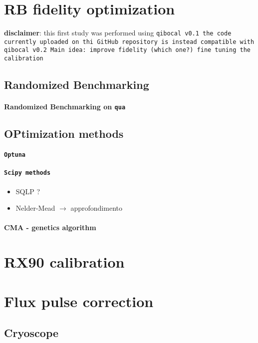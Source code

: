 \section{RB fidelity optimization}
\textbf{disclaimer}: this first study was performed using \tt{qibocal v0.1} the code currently uploaded on thi GitHub repository is instead compatible with \tt{qibocal v0.2}
Main idea: improve fidelity (which one?) fine tuning the calibration

\subsection{Randomized Benchmarking}
\paragraph{Randomized Benchmarking on \tt{qua}} %

\subsection{OPtimization methods}
\paragraph{\tt{Optuna}}
\paragraph{\tt{Scipy} methods}
\begin{itemize}
    \item SQLP ?
    \item Nelder-Mead $\rightarrow$ approfondimento
\end{itemize}
\paragraph{CMA - genetics algorithm}

\section{RX90 calibration}

\section{Flux pulse correction}
\subsection{Cryoscope}
\begin{comment}
    TO DO LIST:
    * calcoli analitic per assunzioni del cryoscope
    * calcoli analitici di convoluzioni per dimostrare che è giusto il modo in cui combiniamo i filtri
    * eventualmente provare ad aggiungere più correzioni esponenziali
\end{comment}
